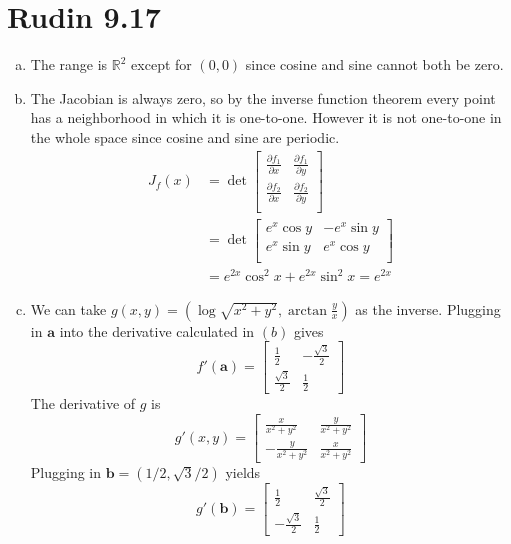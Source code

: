 \documentclass{article}
\begin{document}
\section*{Rudin 9.17}
\begin{enumerate}[(a)]
  \item The range is $\mathbb{R}^2$ except for $(0,0)$ since cosine and sine cannot both be zero.
  \item The Jacobian is always zero, so by the inverse function theorem every point has a neighborhood 
  in which it is one-to-one. However it is not one-to-one in the whole space since cosine and sine are periodic.
  \begin{align*}
    J_f(x) &= 
      \det \begin{bmatrix}
        \frac{\partial f_1}{\partial x} & \frac{\partial f_1}{\partial y} \\
        \frac{\partial f_2}{\partial x} & \frac{\partial f_2}{\partial y} \\
      \end{bmatrix}\\ &=
      \det \begin{bmatrix}
        e^x\cos y & -e^x\sin y \\
        e^x\sin y & e^x\cos y \\
      \end{bmatrix}\\ &=
      e^{2x} \cos^2 x + e^{2x} \sin^2 x = e^{2x}
  \end{align*}
  \item We can take $g(x, y) = (\log \sqrt{x^2 +y^2}, \arctan \frac{y}{x})$ as the inverse.
  Plugging in $\bm{a}$ into the derivative calculated in $(b)$ gives
  \[  
    f'(\bm{a}) = 
    \begin{bmatrix}
      \frac{1}{2} & -\frac{\sqrt{3}}{2} \\
      \frac{\sqrt{3}}{2} & \frac{1}{2}
    \end{bmatrix}
  \]
  The derivative of $g$ is 
  \[
    g'(x, y) = 
    \begin{bmatrix}
      \frac{x}{x^2 +y^2} & \frac{y}{x^2 +y^2} \\
      -\frac{y}{x^2 +y^2} & \frac{x}{x^2 +y^2} 
    \end{bmatrix}
  \]
  Plugging in $\bm{b} = (1/2, \sqrt{3}/2)$ yields
  \[
    g'(\bm{b}) = 
    \begin{bmatrix}
      \frac{1}{2} & \frac{\sqrt{3}}{2} \\
      -\frac{\sqrt{3}}{2} & \frac{1}{2}
    \end{bmatrix}
\]
\end{enumerate}
\end{document}
